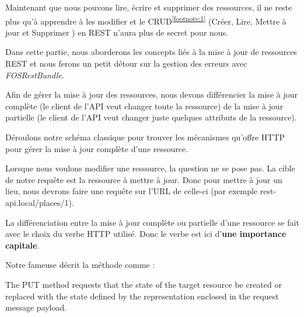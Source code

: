 \documentclass[big]{zmdocument}
\begin{document}


Maintenant que nous pouvons lire, écrire et supprimer des ressources, il ne reste plus qu'à apprendre à les modifier et le CRUD\textsuperscript{\ref{footnote:1}} (Créer, Lire, Mettre à jour et Supprimer ) en REST n'aura plus de secret pour nous.



Dans cette partie, nous aborderons les concepts liés à la mise à jour de ressources REST et nous ferons un petit détour sur la gestion des erreurs avec \textit{FOSRestBundle}.






Afin de gérer la mise à jour des ressources, nous devons différencier la mise à jour complète (le client de l'API veut changer toute la ressource) de la mise à jour partielle (le client de l'API veut changer juste quelques attributs de la ressource).



Déroulons notre schéma classique pour trouver les mécanismes qu'offre HTTP pour gérer la mise à jour complète d'une ressource.





Lorsque nous voulons modifier une ressource, la question ne se pose pas. La cible de notre requête est la ressource à mettre à jour.
Donc pour mettre à jour un lieu, nous devrons faire une requête sur l'URL de celle-ci (par exemple rest-api.local/places/1).





La différenciation entre la mise à jour complète ou partielle d'une ressource se fait avec le choix du verbe HTTP utilisé. Donc le verbe est ici d'\textbf{une importance capitale}.



Notre fameuse  décrit la méthode  comme :



\begin{Quotation}
The PUT method requests that the state of the target resource be created or replaced with the state defined by the representation enclosed in the request message payload.
\end{Quotation}
\end{document}
